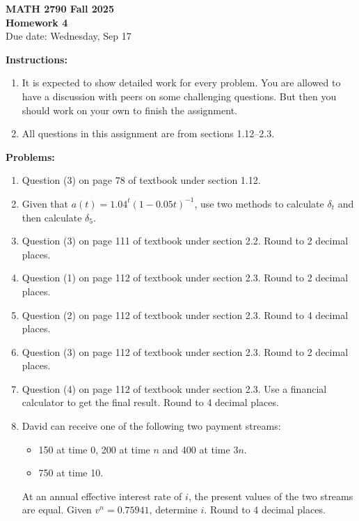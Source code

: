 \documentclass[12pt]{article}
\begin{document}
\begin{center}
\textbf{\Large MATH 2790 Fall 2025}\\[1em]
\textbf{\Large Homework 4}\\[0.5em]
Due date: Wednesday, Sep 17
\end{center}

\bigskip

\textbf{Instructions:}

\begin{enumerate}[label=(\alph*)]
\item It is expected to show detailed work for every problem. You are allowed to have a
discussion with peers on some challenging questions. But then you should work on
your own to finish the assignment.

\item All questions in this assignment are from sections 1.12--2.3.
\end{enumerate}

\bigskip

\textbf{Problems:}

\begin{enumerate}
\item Question (3) on page 78 of textbook under section 1.12.

\item Given that $a(t) = 1.04^t(1 - 0.05t)^{-1}$, use two methods to calculate $\delta_t$ and then calculate $\delta_5$.

\item Question (3) on page 111 of textbook under section 2.2. Round to 2 decimal places.

\item Question (1) on page 112 of textbook under section 2.3. Round to 2 decimal places.

\item Question (2) on page 112 of textbook under section 2.3. Round to 4 decimal places.

\item Question (3) on page 112 of textbook under section 2.3. Round to 2 decimal places.

\item Question (4) on page 112 of textbook under section 2.3. Use a financial calculator
to get the final result. Round to 4 decimal places.

\item David can receive one of the following two payment streams:
\begin{itemize}
\item 150 at time 0, 200 at time $n$ and 400 at time $3n$.
\item 750 at time 10.
\end{itemize}
At an annual effective interest rate of $i$, the present values of the two streams are
equal. Given $v^n = 0.75941$, determine $i$. Round to 4 decimal places.
\end{enumerate}
\end{document}
